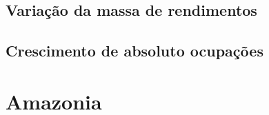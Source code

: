 \documentclass[8pt]{beamer}
\begin{document}
\subsection{Variação da massa de rendimentos}

\begin{frame}
\textit{\hyperlink{indice_principal_amz_ac}{}}

\end{frame}

\begin{frame}
\textit{\hyperlink{indice_principal_amz_ac}{}}

\end{frame}

\subsection{Crescimento de absoluto ocupações}

\begin{frame}
\textit{\hyperlink{indice_principal_amz_ac}{}}

\end{frame}

\begin{frame}
\textit{\hyperlink{indice_principal_amz_ac}{}}

\end{frame}

\section{Amazonia}
\end{document}
